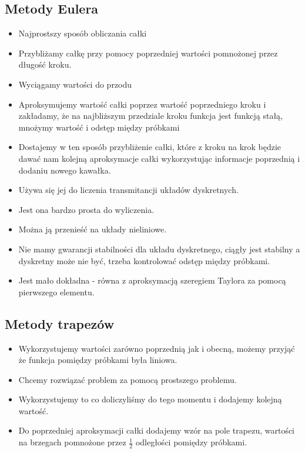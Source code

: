 \documentclass[a4paper]{article}
\begin{document}
\subsection{Metody Eulera}
\begin{itemize}
    \item Najprostszy sposób obliczania całki
    \item Przybliżamy całkę przy pomocy poprzedniej wartości pomnożonej przez długość kroku.
    \item Wyciągamy wartości do przodu
    \item Aproksymujemy wartość całki poprzez wartość poprzedniego kroku i zakładamy, że na najbliższym przedziale kroku funkcja jest funkcją stałą, mnożymy wartość i odstęp między próbkami
    \item Dostajemy w ten sposób przybliżenie całki, które z kroku na krok będzie dawać nam kolejną aproksymacje całki wykorzystując informacje poprzednią i dodaniu nowego kawałka.
    \item Używa się jej do liczenia transmitancji układów dyskretnych.
    \item Jest ona bardzo prosta do wyliczenia.
    \item Można ją przenieść na układy nieliniowe.
    \item Nie mamy gwarancji stabilności dla układu dyskretnego, ciągły jest stabilny a dyskretny może nie być, trzeba kontrolować odstęp między próbkami.
    \item Jest mało dokładna - równa z aproksymacją szeregiem Taylora za pomocą pierwszego elementu.
\end{itemize}

\subsection{Metody trapezów}
\begin{itemize}
    \item Wykorzystujemy wartości zarówno poprzednią jak i obecną, możemy przyjąć że funkcja pomiędzy próbkami była liniowa.
    \item Chcemy rozwiązać problem za pomocą prostszego problemu.
    \item Wykorzystujemy to co doliczyliśmy do tego momentu i dodajemy kolejną wartość.
    \item Do poprzedniej aproksymacji całki dodajemy wzór na pole trapezu, wartości na brzegach pomnożone przez $\frac{1}{2}$ odległości pomiędzy próbkami.
\end{itemize}
\end{document}

